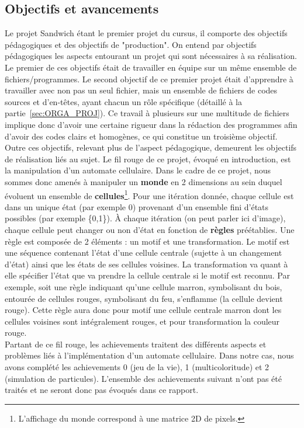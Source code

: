 \documentclass[a4paper]{article}
\begin{document}
\subsection{Objectifs et avancements}
\vspace{0.1cm}
Le projet Sandwich étant le premier projet du cursus, il comporte des objectifs pédagogiques et des objectifs de "production".
On entend par objectifs pédagogiques les aspects entourant un projet qui sont nécessaires à sa réalisation. Le premier de ces objectifs était de travailler en équipe sur un même ensemble de fichiers/programmes. Le second objectif de ce premier projet était d'apprendre à travailler avec non pas un seul fichier, mais un ensemble de fichiers de codes sources et d'en-têtes, ayant chacun un rôle spécifique (détaillé à la partie~\ref{sec:ORGA_PROJ}). Ce travail à plusieurs sur une multitude de fichiers implique donc d'avoir une certaine rigueur dans la rédaction des programmes afin d'avoir des codes clairs et homogènes, ce qui constitue un troisième objectif.\\
\indent Outre ces objectifs, relevant plus de l'aspect pédagogique, demeurent les objectifs de réalisation liés au sujet. Le fil rouge de ce projet, évoqué en introduction, est la manipulation d'un automate cellulaire.
Dans le cadre de ce projet, nous sommes donc amenés à manipuler un \textbf{monde} en 2 dimensions au sein duquel évoluent un ensemble de \textbf{cellules}\footnote{L'affichage du monde correspond à une matrice 2D de pixels.}. Pour une itération donnée, chaque cellule est dans un unique état (par exemple 0) provenant d'un ensemble fini d'états possibles (par exemple \{0,1\}). À chaque itération (on peut parler ici d'image), chaque cellule peut changer ou non d'état en fonction de \textbf{règles} préétablies. Une règle est composée de 2 éléments : un motif et une transformation. Le motif est une séquence contenant l'état d'une cellule centrale (sujette à un changement d'état) ainsi que les états de ses cellules voisines. La transformation va quant à elle spécifier l'état que va prendre la cellule centrale si le motif est reconnu. Par exemple, soit une règle indiquant qu'une cellule marron, symbolisant du bois, entourée de cellules rouges, symbolisant du feu, s'enflamme (la cellule devient rouge). Cette règle aura donc pour motif une cellule centrale marron dont les cellules voisines sont intégralement rouges, et pour transformation la couleur rouge.\\
\indent Partant de ce fil rouge, les achievements traitent des différents aspects et problèmes liés à l'implémentation d'un automate cellulaire. Dans notre cas, nous avons complété les achievements 0 (jeu de la vie), 1 (multicoloritude) et 2 (simulation de particules). L'ensemble des achievements suivant n'ont pas été traités et ne seront donc pas évoqués dans ce rapport.
\end{document}
